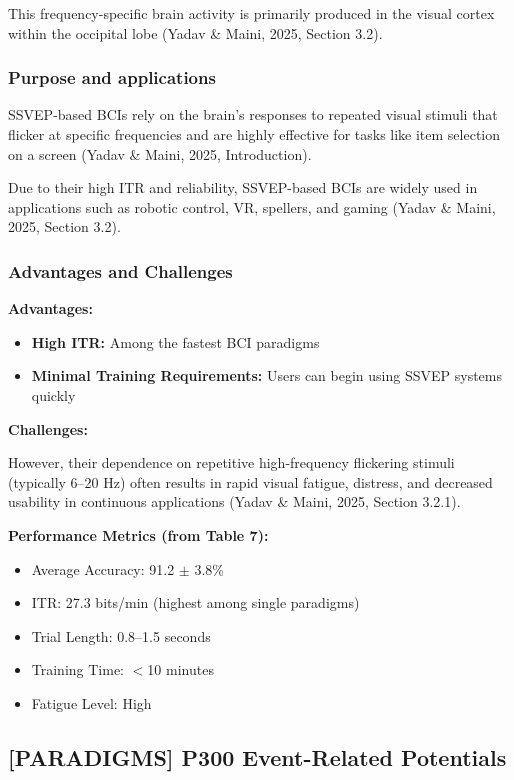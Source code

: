 \documentclass[12pt]{article}
\begin{document}
This frequency-specific brain activity is primarily produced in the visual cortex within the occipital lobe (Yadav \& Maini, 2025, Section 3.2).

\subsubsection{Purpose and applications}

SSVEP-based BCIs rely on the brain's responses to repeated visual stimuli that flicker at specific frequencies and are highly effective for tasks like item selection on a screen (Yadav \& Maini, 2025, Introduction).

Due to their high ITR and reliability, SSVEP-based BCIs are widely used in applications such as robotic control, VR, spellers, and gaming (Yadav \& Maini, 2025, Section 3.2).

\subsubsection{Advantages and Challenges}

\textbf{Advantages:}
\begin{itemize}
    \item \textbf{High ITR:} Among the fastest BCI paradigms
    \item \textbf{Minimal Training Requirements:} Users can begin using SSVEP systems quickly
\end{itemize}

\textbf{Challenges:}

However, their dependence on repetitive high-frequency flickering stimuli (typically 6–20 Hz) often results in rapid visual fatigue, distress, and decreased usability in continuous applications (Yadav \& Maini, 2025, Section 3.2.1).

\textbf{Performance Metrics (from Table 7):}
\begin{itemize}
    \item Average Accuracy: 91.2 $\pm$ 3.8\%
    \item ITR: 27.3 bits/min (highest among single paradigms)
    \item Trial Length: 0.8–1.5 seconds
    \item Training Time: $<$10 minutes
    \item Fatigue Level: High
\end{itemize}

\subsection{[PARADIGMS] P300 Event-Related Potentials}
\end{document}
